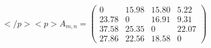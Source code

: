 \documentclass[12pt]{article}
\begin{document}
$ \begin{equation*}</p>
<p>    A_{m,n} =     \begin{pmatrix}0 &15.98 & 15.80& 5.22\\ 23.78 & 0 &16.91 & 9.31 \\ 37.58 & 25.35 & 0 & 22.07 \\ 27.86 & 22.56 & 18.58 & 0    \end{pmatrix}\end{equation*} $
\end{document}
